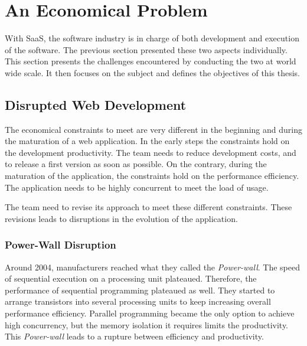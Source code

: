 \section{An Economical Problem} \label{chapter2:problem-statement}

With SaaS, the software industry is in charge of both development and execution of the software.
The previous section presented these two aspects individually.
This section presents the challenges encountered by conducting the two at world wide scale.
It then focuses on the subject and defines the objectives of this thesis.

\subsection{Disrupted Web Development}

The economical constraints to meet are very different in the beginning and during the maturation of a web application.
In the early steps the constraints hold on the development productivity.
The team needs to reduce development costs, and to release a first version as soon as possible.
On the contrary, during the maturation of the application, the constraints hold on the performance efficiency.
The application needs to be highly concurrent to meet the load of usage.

The team need to revise its approach to meet these different constraints.
These revisions leads to disruptions in the evolution of the application.

\subsubsection{Power-Wall Disruption}


Around 2004, manufacturers reached what they called the \textit{Power-wall}.
The speed of sequential execution on a processing unit plateaued.
Therefore, the performance of sequential programming plateaued as well.
They started to arrange transistors into several processing units to keep increasing overall performance efficiency. %
Parallel programming became the only option to achieve high concurrency, but the memory isolation it requires limits the productivity.
This \textit{Power-wall} leads to a rupture between efficiency and productivity.

